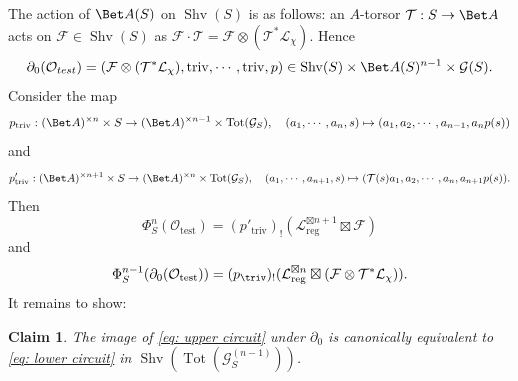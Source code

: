 \documentclass[10pt]{amsart}
\newcommand{\sssec}{\subsubsection}
\newtheorem{claim}[subsubsection]{Claim}
\theoremstyle{remark}
\newcommand{\pa}{\partial}
\newcommand{\on}{\operatorname}
\newcommand{\cF}{\mathcal{F}}
\newcommand{\cG}{\mathcal{G}}
\newcommand{\cL}{\mathcal{L}}
\newcommand{\cO}{\mathcal{O}}
\newcommand{\cT}{\mathcal{T}}
\newcommand{\Shv}{\on{Shv}}
\begin{document}
\sssec{}
The action of $\Bet A(S)$ on $\Shv(S)$ is as follows: an $A$-torsor $\cT: S\rightarrow \Bet A$ acts on $\cF\in\Shv(S)$ as
$\cF\cdot \cT= \cF\otimes (\cT^*\cL_{\chi})$. Hence 
\[\pa_0(\cO_{test})=(\cF\otimes (\cT^*\cL_{\chi}),\on{triv},\cdots,\on{triv},p)\in \Shv(S)\times \Bet A(S)^{n-1}\times\cG(S).\]
Consider the map
\[p_{\on{triv}}: (\Bet A)^{\times n}\times S\rightarrow (\Bet A)^{\times  n-1}\times\on{Tot}(\cG_S),\quad (a_1,\cdots, a_n,s)\mapsto (a_1,a_2,\cdots, a_{n-1}, a_{n}p(s))\]
and 
\[p'_{\on{triv}}: (\Bet A)^{\times n+1}\times S\rightarrow (\Bet A)^{\times  n}\times\on{Tot}(\cG_S),\quad (a_1,\cdots, a_{n+1},s)\mapsto (\cT(s)a_1,a_2,\cdots, a_{n}, a_{n+1}p(s)).\]
Then 
\begin{equation}\label{eq: upper circuit}
    \Phi^n_S(\cO_{\on{test}})=(p'_{\on{triv}})_!(\cL^{\boxtimes n+1}_{\on{reg}}\boxtimes \cF)
\end{equation}
and
\begin{equation}\label{eq: lower circuit}
    \Phi^{n-1}_S(\pa_0(\cO_{\on{test}}))=(p_{\triv})_!(\cL^{\boxtimes n}_{\on{reg}}\boxtimes (\cF\otimes \cT^*\cL_{\chi})).
\end{equation}
It remains to show:
\begin{claim}\label{claim: O test claim}
    The image of \eqref{eq: upper circuit} under $\pa_0$ is canonically equivalent to \eqref{eq: lower circuit} in $\Shv(\on{Tot}(\cG^{(n-1)}_S))$.
\end{claim}
\end{document}
